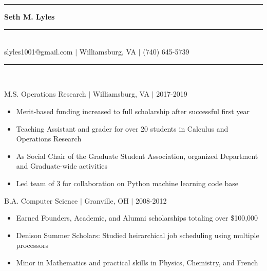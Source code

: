 \documentclass[11pt]{article}
\begin{document}
\begin{center}
\noindent\rule[5pt]{140pt}{.4pt}\LARGE\bf{ Seth M. Lyles }\rule[5pt]{140pt}{.4pt}\\ %
{\large slyles1001@gmail.com $|$ Williamsburg, VA $|$ (740) 645-5739}
\end{center}


\vspace{8pt}\hrule\vspace{10pt}
\\
\vspace{-8pt}

\hfill {M.S. Operations Research $|$ Williamsburg, VA $|$ 2017-2019}

\begin{itemize}
\item Merit-based funding increased to full scholarship after successful first year
\item Teaching Assistant and grader for over 20 students in Calculus and Operations Research
\item As Social Chair of the Graduate Student Association, organized Department and Graduate-wide activities
\item Led team of 3 for collaboration on Python machine learning code base
\end{itemize}

\hfill { B.A. Computer Science $|$ Granville, OH $|$ 2008-2012}

\begin{itemize}
\item Earned Founders, Academic, and Alumni scholarships totaling over \$100,000
\item Denison Summer Scholars: Studied heirarchical job scheduling using multiple processors
\item Minor in Mathematics and practical skills in Physics, Chemistry, and French
\end{itemize}
\end{document}
